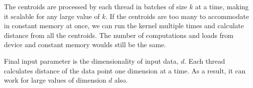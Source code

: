 The centroids are processed by each thread in batches of size $k$ at a time, making it scalable for any large value of $k$. If the centroids are too many to accommodate in constant memory at once, we can run the kernel multiple times and calculate distance from all the centroids. The number of computations and loads from device and constant memory woulds still be the same.

Final input parameter is the dimensionality of input data, $d$. Each thread calculates distance of the data point one dimension at a time. As a result, it can work for large values of dimension $d$ also.
